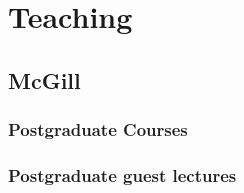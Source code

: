 \documentclass[
  letterpaper,
  DIV=11,
  numbers=noendperiod]{scrartcl}
\begin{document}
\section{Teaching}\label{teaching}

\subsection{McGill}\label{mcgill}

\subsubsection{Postgraduate Courses}\label{postgraduate-courses}

\subsubsection{Postgraduate guest
lectures}\label{postgraduate-guest-lectures}
\end{document}
